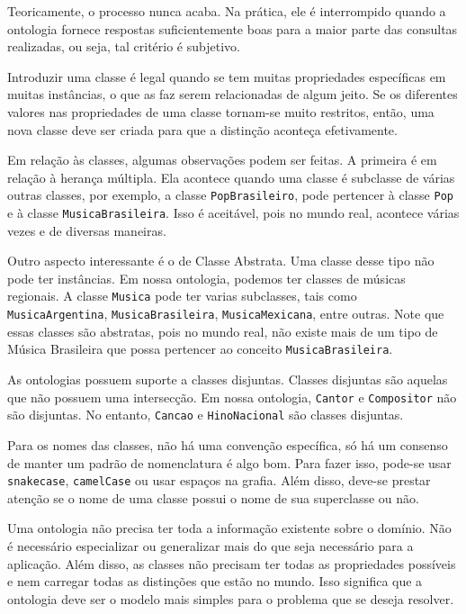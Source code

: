 Teoricamente, o processo nunca acaba. Na prática, ele é interrompido quando a ontologia fornece respostas suficientemente boas para a maior parte das consultas realizadas, ou seja, tal critério é subjetivo.

Introduzir uma classe é legal quando se tem muitas propriedades específicas em muitas instâncias, o que as faz serem relacionadas de algum jeito. Se os diferentes valores nas propriedades de uma classe tornam-se muito restritos, então, uma nova classe deve ser criada para que a distinção aconteça efetivamente.

Em relação às classes, algumas observações podem ser feitas. A primeira é em relação à herança múltipla. Ela acontece quando uma classe é subclasse de várias outras classes, por exemplo, a classe \texttt{PopBrasileiro}, pode pertencer à classe \texttt{Pop} e à classe \texttt{MusicaBrasileira}. Isso é aceitável, pois no mundo real, acontece várias vezes e de diversas maneiras.

Outro aspecto interessante é o de Classe Abstrata. Uma classe desse tipo não pode ter instâncias. Em nossa ontologia, podemos ter classes de músicas regionais. A classe \texttt{Musica} pode ter varias subclasses, tais como \texttt{MusicaArgentina}, \texttt{MusicaBrasileira}, \texttt{MusicaMexicana}, entre outras. Note que essas classes são abstratas, pois no mundo real, não existe mais de um tipo de Música Brasileira que possa pertencer ao conceito \texttt{MusicaBrasileira}.

As ontologias possuem suporte a classes disjuntas. Classes disjuntas são aquelas que não possuem uma intersecção. Em nossa ontologia, \texttt{Cantor} e \texttt{Compositor} não são disjuntas. No entanto, \texttt{Cancao} e \texttt{HinoNacional} são classes disjuntas.

Para os nomes das classes, não há uma convenção específica, só há um consenso de manter um padrão de nomenclatura é algo bom. Para fazer isso, pode-se usar \texttt{snake\textunderscore case}, \texttt{camelCase} ou usar espaços na grafia. Além disso, deve-se prestar atenção se o nome de uma classe possui o nome de sua superclasse ou não.

Uma ontologia não precisa ter toda a informação existente sobre o domínio. Não é necessário especializar ou generalizar mais do que seja necessário para a aplicação. Além disso, as classes não precisam ter todas as propriedades possíveis e nem carregar todas as distinções que estão no mundo. Isso significa que a ontologia deve ser o modelo mais simples para o problema que se deseja resolver.

